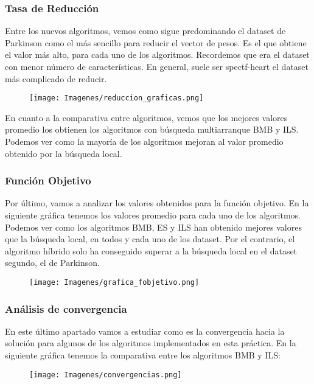 \documentclass[10pt, a4paper]{article}
\theoremstyle{theorem-style}
\theoremstyle{theorem-style}
\theoremstyle{theorem2-style}
\theoremstyle{definition-style}
\theoremstyle{remark-style}
\theoremstyle{example-style}
\theoremstyle{definition-style}
\theoremstyle{remark-style}
\theoremstyle{remark-style}
\begin{document}
\subsubsection{Tasa de Reducción}

Entre los nuevos algoritmos, vemos como sigue predominando el dataset de Parkinson como el más sencillo para reducir el vector de pesos. Es el que obtiene el valor más alto, para cada uno de los algoritmos. Recordemos que era el dataset con menor número de características. En general, suele ser spectf-heart el dataset más complicado de reducir. 
\pagebreak
\begin{figure}[htp]
\centering
\texttt{[image: Imagenes/reduccion\_graficas.png]}
\label{}
\end{figure}

En cuanto a la comparativa entre algoritmos, vemos que los mejores valores promedio los obtienen los algoritmos con búsqueda multiarranque BMB y ILS. Podemos ver como la mayoría de los algoritmos mejoran al valor promedio obtenido por la búsqueda local. 

\subsubsection{Función Objetivo}

Por último, vamos a analizar los valores obtenidos para la función objetivo. En la siguiente gráfica tenemos los valores promedio para cada uno de los algoritmos. Podemos ver como los algoritmos BMB, ES y ILS han obtenido mejores valores que la búsqueda local, en todos y cada uno de los dataset. Por el contrario, el algoritmo híbrido solo ha conseguido superar a la búsqueda local en el dataset segundo, el de Parkinson. 

\begin{figure}[htp]
\centering
\texttt{[image: Imagenes/grafica\_fobjetivo.png]}
\label{}
\end{figure}

\newpage
\subsubsection{Análisis de convergencia}

En este último apartado vamos a estudiar como es la convergencia hacia la solución para algunos de los algoritmos implementados en esta práctica. En la siguiente gráfica tenemos la comparativa entre los algoritmos BMB y ILS:   

\begin{figure}[htp]
\centering
\texttt{[image: Imagenes/convergencias.png]}
\label{}
\end{figure}
\end{document}
